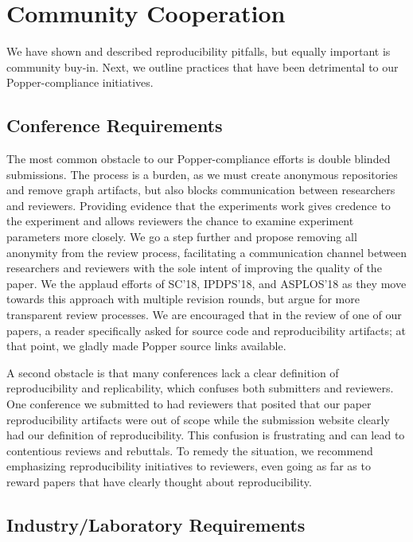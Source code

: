 \section{Community Cooperation}
\label{sec:community-cooperation}

We have shown and described reproducibility pitfalls, but equally important is
community buy-in. Next, we outline practices that have been detrimental to our
Popper-compliance initiatives.

\subsection{Conference Requirements}

The most common obstacle to our Popper-compliance efforts is double blinded
submissions. The process is a burden, as we must create anonymous repositories
and remove graph artifacts, but also blocks communication between researchers
and reviewers. Providing evidence that the experiments work gives credence to
the experiment and allows reviewers the chance to examine experiment parameters
more closely. We go a step further and propose removing all anonymity from the
review process, facilitating a communication channel between researchers and
reviewers with the sole intent of improving the quality of the paper. We the
applaud efforts of SC'18, IPDPS'18, and ASPLOS'18 as they move towards this
approach with multiple revision rounds, but argue for more transparent review
processes. We are encouraged that in the review of one of our papers, a reader
specifically asked for source code and reproducibility artifacts; at that
point, we gladly made Popper source links available.

A second obstacle is that many conferences lack a clear definition of
reproducibility and replicability, which confuses both submitters and
reviewers. One conference we submitted to had reviewers that posited that
our paper reproducibility artifacts were out of scope while the submission
website clearly had our definition of reproducibility. This confusion is
frustrating and can lead to contentious reviews and rebuttals. To remedy the
situation, we recommend emphasizing reproducibility initiatives to reviewers,
even going as far as to reward papers that have clearly thought about
reproducibility.

\subsection{Industry/Laboratory Requirements}
\label{sec:reqs}

